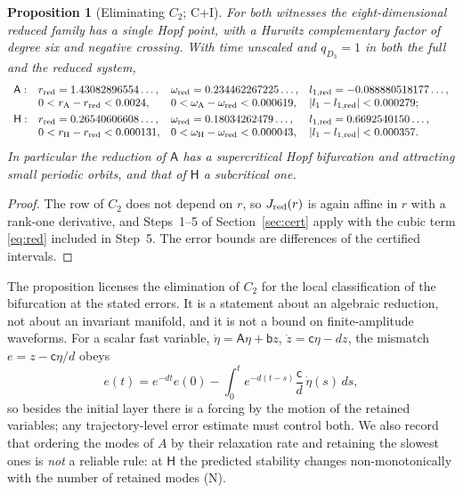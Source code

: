 \documentclass[11pt,a4paper]{article}
\theoremstyle{plain}
\newtheorem{proposition}[theorem]{Proposition}
\theoremstyle{definition}
\theoremstyle{remark}
\newcommand{\rA}{r_{\mathrm A}}
\newcommand{\omA}{\omega_{\mathrm A}}
\newcommand{\rH}{r_{\mathrm H}}
\newcommand{\omH}{\omega_{\mathrm H}}
\newcommand{\WA}{\mathsf A}
\newcommand{\WH}{\mathsf H}
\newcommand{\evC}{\textsf{C}}
\newcommand{\evI}{\textsf{I}}
\newcommand{\evN}{\textsf{N}}
\begin{document}
\begin{proposition}[Eliminating $C_2$; \evC+\evI]\label{prop:reduced}
For both witnesses the eight-dimensional reduced family has a single Hopf point, with a Hurwitz complementary factor of degree six and negative crossing. With time unscaled and $q_{D_3}=1$ in both the full and the reduced system,
\[
\begin{array}{lllll}
 \WA:& r_{\rm red}=1.43082896554\ldots,& \omega_{\rm red}=0.234462267225\ldots,& l_{1,\rm red}=-0.088880518177\ldots,\\
 & 0<\rA-r_{\rm red}<0.0024,& 0<\omA-\omega_{\rm red}<0.000619,& |l_1-l_{1,\rm red}|<0.000279;\\[3pt]
 \WH:& r_{\rm red}=0.26540606608\ldots,& \omega_{\rm red}=0.18034262479\ldots,& l_{1,\rm red}=0.6692540150\ldots,\\
 & 0<\rH-r_{\rm red}<0.000131,& 0<\omH-\omega_{\rm red}<0.000043,& |l_1-l_{1,\rm red}|<0.000357.
\end{array}
\]
In particular the reduction of $\WA$ has a supercritical Hopf bifurcation and attracting small periodic orbits, and that of $\WH$ a subcritical one.
\end{proposition}
\begin{proof}
The row of $C_2$ does not depend on $r$, so $J_{\rm red}(r)$ is again affine in $r$ with a rank-one derivative, and Steps~1--5 of Section~\ref{sec:cert} apply with the cubic term \eqref{eq:red} included in Step~5. The error bounds are differences of the certified intervals.
\end{proof}
The proposition licenses the elimination of $C_2$ for the local classification of the bifurcation at the stated errors. It is a statement about an algebraic reduction, not about an invariant manifold, and it is not a bound on finite-amplitude waveforms. For a scalar fast variable, $\dot\eta=\mathsf A\eta+\mathsf bz$, $\dot z=\mathsf c\eta-dz$, the mismatch $e=z-\mathsf c\eta/d$ obeys
\begin{equation}\label{eq:mismatch}
 e(t)=e^{-dt}e(0)-\int_0^te^{-d(t-s)}\frac{\mathsf c}{d}\,\dot\eta(s)\,ds ,
\end{equation}
so besides the initial layer there is a forcing by the motion of the retained variables; any trajectory-level error estimate must control both. We also record that ordering the modes of $A$ by their relaxation rate and retaining the slowest ones is \emph{not} a reliable rule: at $\WH$ the predicted stability changes non-monotonically with the number of retained modes (\evN).
\end{document}
